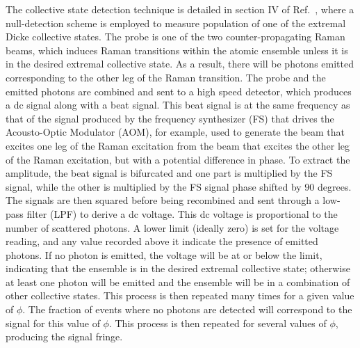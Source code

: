 \documentclass[aps,pra,letterpaper,superscriptaddress,showpacs,amsmath,floats,twocolumn]{revtex4-1}
\begin{document}
The collective state detection technique is detailed in section IV of Ref.~\cite{COSAIN}, where a null-detection scheme is employed to measure population of one of the extremal Dicke collective states. The probe is one of the two counter-propagating Raman beams, which induces Raman transitions within the atomic ensemble unless it is in the desired extremal collective state. As a result, there will be photons emitted corresponding to the other leg of the Raman transition. The probe and the emitted photons are combined and sent to a high speed detector, which produces a dc signal along with a beat signal. This beat signal is at the same frequency as that of the signal produced by the frequency synthesizer (FS) that drives the Acousto-Optic Modulator (AOM), for example, used to generate the beam that excites one leg of the Raman excitation from the beam that excites the other leg of the Raman excitation, but with a potential difference in phase. To extract the amplitude, the beat signal is bifurcated and one part is multiplied by the FS signal, while the other is multiplied by the FS signal phase shifted by $90$ degrees. The signals are then squared before being recombined and sent through a low-pass filter (LPF) to derive a dc voltage. This dc voltage is proportional to the number of scattered photons. A lower limit (ideally zero) is set for the voltage reading, and any value recorded above it indicate the presence of emitted photons. If no photon is emitted, the voltage will be at or below the limit, indicating that the ensemble is in the desired extremal collective state; otherwise at least one photon will be emitted and the ensemble will be in a combination of other collective states. This process is then repeated many times for a given value of $\phi$. The fraction of events where no photons are detected will correspond to the signal for this value of $\phi$. This process is then repeated for several values of $\phi$, producing the signal fringe.
\end{document}
